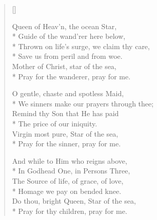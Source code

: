\newHymn

\settowidth{\versewidth}{Hail, Queen of Heav'n, the ocean Star}


\begin{verse}[\versewidth]

\begin{patverse}
 Queen of Heav'n, the ocean Star,\\*
    Guide of the wand'rer here below,\\*
        Thrown on life's
surge, we claim thy care,\\*
    Save us from peril
    and from woe.\\
        Mother of
Christ, star
of the sea,\\*
    Pray for
    the
    wanderer,
    pray for me.
\end{patverse}

\begin{patverse}
O gentle, chaste and spotless Maid,\\*
    We sinners make our prayers through thee;\\
Remind thy Son that He has paid\\*
    The price of our iniquity.\\
        Virgin most pure, Star of the sea,\\*
    Pray for the sinner, pray for me.
\end{patverse}


\begin{patverse}
And while to Him who reigns above,\\*
    In Godhead One, in Persons Three,\\
        The Source of life, of
grace, of love,\\*
    Homage we pay on
    bended knee.\\
        Do thou,
bright Queen,
Star of the sea,\\*
    Pray for
    thy
    children,
    pray for me.
\end{patverse}
    
\end{verse}

    

